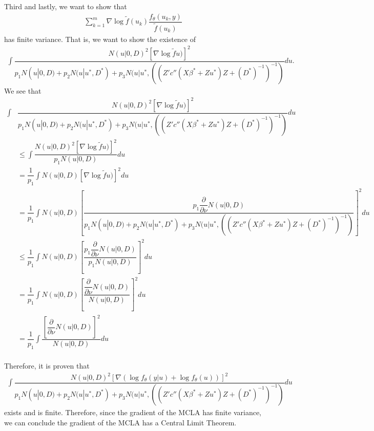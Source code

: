 \documentclass{article}
\begin{document}
Third and lastly, we want to show that 
\begin{align}
\sum_{k=1}^m \nabla \log \tilde{f} (u_k) \dfrac{f_\theta(u_k,y)}{\tilde{f}(u_k)}
\end{align}
 has finite variance. That is, we want to show the existence of
\begin{align}
\int \dfrac{N(u|0,D)^2 \left[\nabla \log \tilde{f}u) \right]^2}{p_1 N(u|0,D)+p_2 N(u|u^*, D^*) + p_3 N(u|u^*, ((Z'  c''(X \beta^*+Zu^*) Z +(D^*)^{-1}   )^{-1})} du.
\end{align}
We see that
\begin{align}
\int& \dfrac{N(u|0,D)^2 \left[\nabla \log \tilde{f}u) \right]^2}{p_1 N(u|0,D)+p_2 N(u|u^*, D^*) + p_3 N(u|u^*, ((Z'  c''(X \beta^*+Zu^*) Z +(D^*)^{-1}   )^{-1})} du\\
&\leq  \int \dfrac{N(u|0,D)^2 \left[\nabla \log \tilde{f}u) \right]^2}{p_1 N(u|0,D)} du\\
&= \dfrac{1}{p_1} \int N(u|0,D) \left[\nabla \log \tilde{f}u) \right]^2 du\\
&=\dfrac{1}{p_1} \int N(u|0,D) \left[  \dfrac{p_1 \dfrac{\partial}{\partial \nu} N(u|0,D)}{p_1 N(u|0,D)+p_2 N(u|u^*,D^*)+p_3 N(u|u^*, ((Z'  c''(X \beta^*+Zu^*) Z +(D^*)^{-1}   )^{-1})}   \right]^2 du\\
&\leq\dfrac{1}{p_1} \int N(u|0,D) \left[  \dfrac{p_1 \dfrac{\partial}{\partial \nu} N(u|0,D)}{p_1 N(u|0,D)}   \right]^2 du\\
&=\dfrac{1}{p_1} \int N(u|0,D) \left[  \dfrac{ \dfrac{\partial}{\partial \nu} N(u|0,D)}{ N(u|0,D)}   \right]^2 du\\
&= \dfrac{1}{p_1} \int \dfrac{\left[ \dfrac{\partial}{\partial \nu} N(u|0,D)  \right]^2}{N(u|0,D)} du \\
\end{align}






Therefore, it is proven that 
\begin{align}
\int \dfrac{N(u|0,D)^2 \left[\nabla \left(\log f_\theta(y|u)+\log f_\theta (u) \right) \right]^2}{p_1 N(u|0,D)+p_2 N(u|u^*, D^*) + p_3 N(u|u^*, ((Z'  c''(X \beta^*+Zu^*) Z +(D^*)^{-1}   )^{-1})} du 
\end{align}
exists and is finite. Therefore, since  the gradient of the MCLA has finite variance, we can conclude the gradient of the MCLA has a Central Limit Theorem.

%
\end{document}

